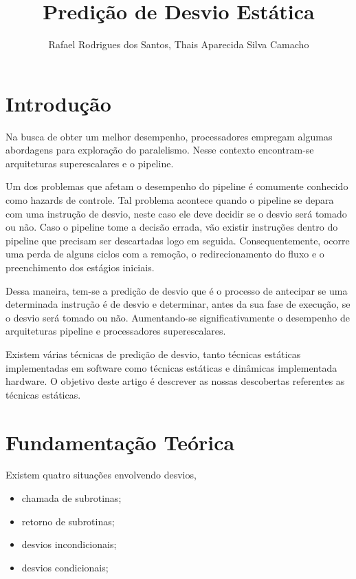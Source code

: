 \documentclass[12pt]{article}
\title{Predição de Desvio Estática}
\author{Rafael Rodrigues dos Santos\inst{1}, Thais Aparecida Silva Camacho\inst{1}}
\begin{document}
 

\maketitle

\section{Introdução}

Na busca de obter um melhor desempenho, processadores empregam algumas abordagens para exploração do paralelismo. Nesse contexto encontram-se arquiteturas superescalares e o pipeline. 

Um dos problemas que afetam o desempenho do pipeline é comumente conhecido como hazards de controle. Tal problema acontece quando  o pipeline se depara com uma
instrução de desvio, neste caso ele deve decidir se o desvio será tomado ou não. Caso o pipeline tome a decisão errada, vão existir instruções dentro do
pipeline que precisam ser descartadas logo em seguida. Consequentemente, ocorre uma perda de alguns ciclos com a remoção, o redirecionamento do fluxo e o preenchimento dos estágios iniciais.

Dessa maneira, tem-se a predição de desvio que é o processo de antecipar se uma determinada instrução é de desvio e determinar, antes da sua fase de execução,
se o desvio será tomado ou não. Aumentando-se significativamente o desempenho de arquiteturas pipeline e processadores superescalares.

Existem várias técnicas de predição de desvio, tanto técnicas estáticas implementadas em software como técnicas estáticas e dinâmicas implementada hardware. O
objetivo deste artigo é descrever as nossas descobertas referentes as técnicas estáticas.

\section{Fundamentação Teórica} \label{sec:firstpage}

Existem quatro situações envolvendo desvios,

\begin{itemize}
	\item chamada de subrotinas;
	\item retorno de subrotinas;
	\item desvios incondicionais;
	\item desvios condicionais;
\end{itemize}
\end{document}
